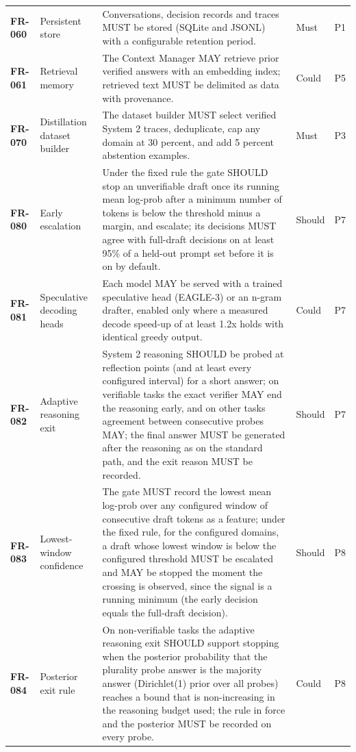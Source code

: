 \begin{longtable}{@{}p{1.45cm}p{2.5cm}p{8.1cm}p{1.6cm}p{1.1cm}@{}}
\textbf{FR-060} & Persistent store & Conversations, decision records and traces MUST be stored (SQLite and JSONL) with a configurable retention period. & Must & P1\\
\textbf{FR-061} & Retrieval memory & The Context Manager MAY retrieve prior verified answers with an embedding index; retrieved text MUST be delimited as data with provenance. & Could & P5\\
\textbf{FR-070} & Distillation dataset builder & The dataset builder MUST select verified System 2 traces, deduplicate, cap any domain at 30 percent, and add 5 percent abstention examples. & Must & P3\\
\textbf{FR-080} & Early escalation & Under the fixed rule the gate SHOULD stop an unverifiable draft once its running mean log-prob after a minimum number of tokens is below the threshold minus a margin, and escalate; its decisions MUST agree with full-draft decisions on at least 95\% of a held-out prompt set before it is on by default. & Should & P7\\
\textbf{FR-081} & Speculative decoding heads & Each model MAY be served with a trained speculative head (EAGLE-3) or an n-gram drafter, enabled only where a measured decode speed-up of at least 1.2x holds with identical greedy output. & Could & P7\\
\textbf{FR-082} & Adaptive reasoning exit & System 2 reasoning SHOULD be probed at reflection points (and at least every configured interval) for a short answer; on verifiable tasks the exact verifier MAY end the reasoning early, and on other tasks agreement between consecutive probes MAY; the final answer MUST be generated after the reasoning as on the standard path, and the exit reason MUST be recorded. & Should & P7\\
\textbf{FR-083} & Lowest-window confidence & The gate MUST record the lowest mean log-prob over any configured window of consecutive draft tokens as a feature; under the fixed rule, for the configured domains, a draft whose lowest window is below the configured threshold MUST be escalated and MAY be stopped the moment the crossing is observed, since the signal is a running minimum (the early decision equals the full-draft decision). & Should & P8\\
\textbf{FR-084} & Posterior exit rule & On non-verifiable tasks the adaptive reasoning exit SHOULD support stopping when the posterior probability that the plurality probe answer is the majority answer (Dirichlet(1) prior over all probes) reaches a bound that is non-increasing in the reasoning budget used; the rule in force and the posterior MUST be recorded on every probe. & Could & P8\\

\end{longtable}
